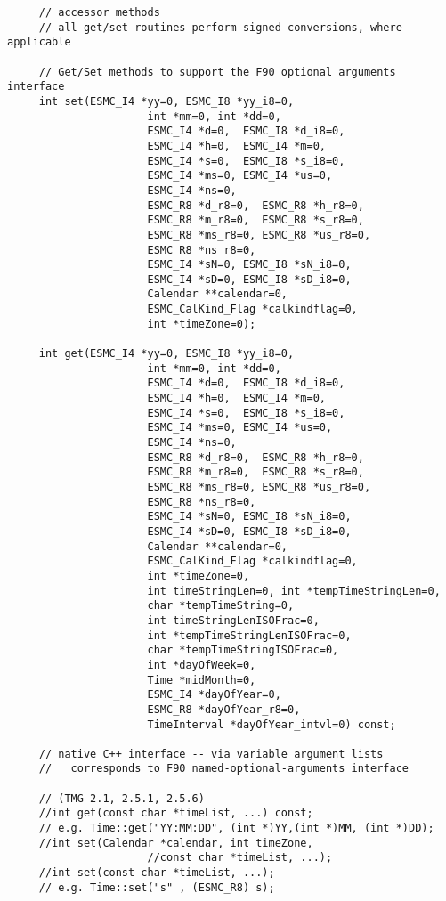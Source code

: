 {\begin{verbatim}
     // accessor methods
     // all get/set routines perform signed conversions, where applicable
 
     // Get/Set methods to support the F90 optional arguments interface
     int set(ESMC_I4 *yy=0, ESMC_I8 *yy_i8=0,
                      int *mm=0, int *dd=0,
                      ESMC_I4 *d=0,  ESMC_I8 *d_i8=0,
                      ESMC_I4 *h=0,  ESMC_I4 *m=0,
                      ESMC_I4 *s=0,  ESMC_I8 *s_i8=0,
                      ESMC_I4 *ms=0, ESMC_I4 *us=0,
                      ESMC_I4 *ns=0,
                      ESMC_R8 *d_r8=0,  ESMC_R8 *h_r8=0,
                      ESMC_R8 *m_r8=0,  ESMC_R8 *s_r8=0,
                      ESMC_R8 *ms_r8=0, ESMC_R8 *us_r8=0,
                      ESMC_R8 *ns_r8=0,
                      ESMC_I4 *sN=0, ESMC_I8 *sN_i8=0,
                      ESMC_I4 *sD=0, ESMC_I8 *sD_i8=0,
                      Calendar **calendar=0, 
                      ESMC_CalKind_Flag *calkindflag=0, 
                      int *timeZone=0);
 
     int get(ESMC_I4 *yy=0, ESMC_I8 *yy_i8=0,
                      int *mm=0, int *dd=0,
                      ESMC_I4 *d=0,  ESMC_I8 *d_i8=0,
                      ESMC_I4 *h=0,  ESMC_I4 *m=0,
                      ESMC_I4 *s=0,  ESMC_I8 *s_i8=0,
                      ESMC_I4 *ms=0, ESMC_I4 *us=0,
                      ESMC_I4 *ns=0,
                      ESMC_R8 *d_r8=0,  ESMC_R8 *h_r8=0,
                      ESMC_R8 *m_r8=0,  ESMC_R8 *s_r8=0,
                      ESMC_R8 *ms_r8=0, ESMC_R8 *us_r8=0,
                      ESMC_R8 *ns_r8=0,
                      ESMC_I4 *sN=0, ESMC_I8 *sN_i8=0,
                      ESMC_I4 *sD=0, ESMC_I8 *sD_i8=0,
                      Calendar **calendar=0, 
                      ESMC_CalKind_Flag *calkindflag=0, 
                      int *timeZone=0,
                      int timeStringLen=0, int *tempTimeStringLen=0,
                      char *tempTimeString=0,
                      int timeStringLenISOFrac=0,
                      int *tempTimeStringLenISOFrac=0,
                      char *tempTimeStringISOFrac=0,
                      int *dayOfWeek=0,
                      Time *midMonth=0,
                      ESMC_I4 *dayOfYear=0,
                      ESMC_R8 *dayOfYear_r8=0,
                      TimeInterval *dayOfYear_intvl=0) const;
 
     // native C++ interface -- via variable argument lists
     //   corresponds to F90 named-optional-arguments interface
 
     // (TMG 2.1, 2.5.1, 2.5.6)
     //int get(const char *timeList, ...) const;
     // e.g. Time::get("YY:MM:DD", (int *)YY,(int *)MM, (int *)DD);
     //int set(Calendar *calendar, int timeZone,
                      //const char *timeList, ...);
     //int set(const char *timeList, ...);
     // e.g. Time::set("s" , (ESMC_R8) s);
 

\end{verbatim}}
